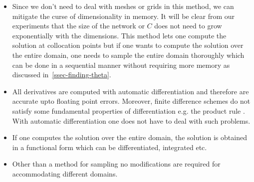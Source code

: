 \begin{itemize}
    \item Since we don't need to deal with meshes or grids in this method, we can mitigate the curse of dimensionality in memory. It will be clear from our experiments that the size of the network or $C$ does not need to grow exponentially with the dimensions. This method lets one compute the solution at collocation points but if one wants to compute the solution over the entire domain, one needs to sample the entire domain thoroughly which can be done in a sequential manner without requiring more memory as discussed in~\ref{ssec-finding-theta}.
    \item All derivatives are computed with automatic differentiation and therefore are accurate upto floating point errors. Moreover, finite difference schemes do not satisfy some fundamental properties of differentiation e.g. the product rule \cite{ranocha2019mimetic}. With automatic differentiation one does not have to deal with such problems. 
    \item If one computes the solution over the entire domain, the solution is obtained in a functional form which can be differentiated, integrated etc.
    \item Other than a method for sampling no modifications are required for accommodating different domains. 
\end{itemize}
